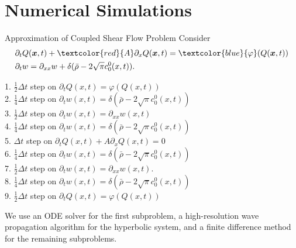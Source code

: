 \section{Numerical Simulations}

\begin{frame}{Approximation of Coupled Shear Flow Problem}
\scriptsize
Consider
\begin{equation}
	\begin{split}
		&\partial_t Q(\boldsymbol{x},t) + \textcolor{red}{A}\partial_x Q(\boldsymbol{x},t) = \textcolor{blue}{\varphi} (Q(\boldsymbol{x},t)) \\
		&\partial_{t}w = \partial_{xx}w + \delta(\bar{\rho}-2\sqrt{\pi} c^0_0(x,t)).
	\end{split}
	\label{coupledsys_1d}
\end{equation}
\pause
	\begin{algorithm}[H]
		\caption{\scriptsize  Splitting algorithm for solving the coupled shear flow problem (\cite{dahm2024numericaldiscretisationhyperbolicsystems}):}
        \scriptsize
		1. $\frac{1}{2} \Delta t$ step on $\partial_t Q(x, t) = \varphi(Q(x, t))$\\
		2. $\frac{1}{4} \Delta t$ step on $\partial_t w(x, t) = \delta(\bar{\rho} - 2\sqrt{\pi} c^0_0(x,t))$\\
		3. $\frac{1}{2} \Delta t$ step on $\partial_t w(x, t) = \partial_{xx} w(x, t)$\\
		4. $\frac{1}{4} \Delta t$ step on $\partial_t w(x, t) = \delta(\bar{\rho} -2\sqrt{\pi} c^0_0(x,t))$\\
		5. $\Delta t$ step on $\partial_t Q(x, t) + A \partial_x Q(x, t) = 0$\\
		6. $\frac{1}{4} \Delta t$ step on $\partial_t w(x, t) = \delta(\bar{\rho} - 2\sqrt{\pi} c^0_0(x,t))$\\
		7. $\frac{1}{2} \Delta t$ step on $\partial_t w(x, t) = \partial_{xx} w(x, t)$. \\
		8. $\frac{1}{4} \Delta t$ step on $\partial_t w(x, t) = \delta(\bar{\rho} -2\sqrt{\pi} c^0_0(x,t))$\\
		9. $\frac{1}{2} \Delta t$ step on $\partial_t Q(x, t) = \varphi(Q(x, t))$\\
	\end{algorithm}
We use an ODE solver for the first subproblem, a high-resolution wave propagation algorithm for the hyperbolic system, and a finite difference method for the remaining subproblems.
\end{frame}


